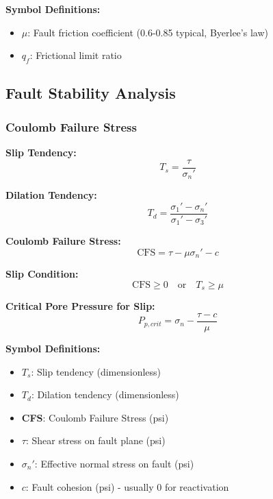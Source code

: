 \documentclass[11pt,a4paper]{article}
\newcommand{\symitem}[2]{\item \textbf{#1}: #2}
\begin{document}
\textbf{Symbol Definitions:}
\begin{itemize}[leftmargin=2cm]
\symitem{$\mu$}{Fault friction coefficient (0.6-0.85 typical, Byerlee's law)}
\symitem{$q_f$}{Frictional limit ratio}
\end{itemize}

\subsection{Fault Stability Analysis}

\subsubsection{Coulomb Failure Stress}

\begin{tcolorbox}[colback=formulabox,colframe=black!75]
\textbf{Slip Tendency:}
\begin{equation}
T_s = \frac{\tau}{\sigma_n'}
\end{equation}

\textbf{Dilation Tendency:}
\begin{equation}
T_d = \frac{\sigma_1' - \sigma_n'}{\sigma_1' - \sigma_3'}
\end{equation}

\textbf{Coulomb Failure Stress:}
\begin{equation}
\text{CFS} = \tau - \mu\sigma_n' - c
\end{equation}

\textbf{Slip Condition:}
\begin{equation}
\text{CFS} \geq 0 \quad \text{or} \quad T_s \geq \mu
\end{equation}

\textbf{Critical Pore Pressure for Slip:}
\begin{equation}
P_{p,crit} = \sigma_n - \frac{\tau - c}{\mu}
\end{equation}
\end{tcolorbox}

\textbf{Symbol Definitions:}
\begin{itemize}[leftmargin=2cm]
\symitem{$T_s$}{Slip tendency (dimensionless)}
\symitem{$T_d$}{Dilation tendency (dimensionless)}
\symitem{CFS}{Coulomb Failure Stress (psi)}
\symitem{$\tau$}{Shear stress on fault plane (psi)}
\symitem{$\sigma_n'$}{Effective normal stress on fault (psi)}
\symitem{$c$}{Fault cohesion (psi) - usually 0 for reactivation}
\end{itemize}
\end{document}
